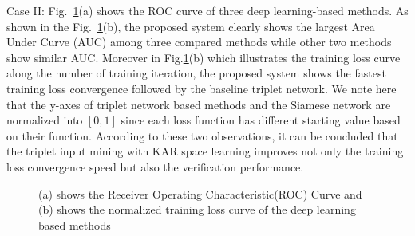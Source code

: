 \documentclass[sigconf]{acmart}
\begin{document}
Case II: Fig.~\ref{fig2}(a) shows the ROC curve of three deep learning-based methods. As shown in the Fig.~\ref{fig2}(b), the proposed system clearly shows the largest Area Under Curve (AUC) among three compared methods while other two methods show similar AUC. Moreover in Fig.\ref{fig2}(b) which illustrates the training loss curve along the number of training iteration, the proposed system shows the fastest training loss convergence followed by the baseline triplet network. We note here that the y-axes of triplet network based methods and the Siamese network are normalized into $[0,1]$ since each loss function has different starting value based on their function. According to these two observations, it can be concluded that the triplet input mining with KAR space learning improves not only the training loss convergence speed but also the verification performance.
\begin{figure}[!ht]
    \begin{center}
    \caption{(a) shows the Receiver Operating Characteristic(ROC) Curve and 
    (b) shows the normalized training loss curve of the deep learning based methods}
    \label{fig2}
    \end{center}
 \end{figure}
\end{document}
